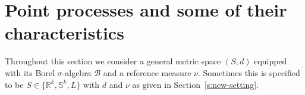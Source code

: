 \documentclass[alpha-refs]{wiley-article}
\begin{document}
\section{Point processes and some of their characteristics}\label{s:3}

Throughout this section we 
consider a general metric space $(S,d)$ equipped with its Borel $\sigma$-algebra $\mathcal B$ and
a reference measure $\nu$. Sometimes this is specified to be $S\in\{\mathbb R^k,\mathbb S^k,L\}$ with $d$ and $\nu$ as given in Section~\ref{s:new-setting}.


\end{document}
